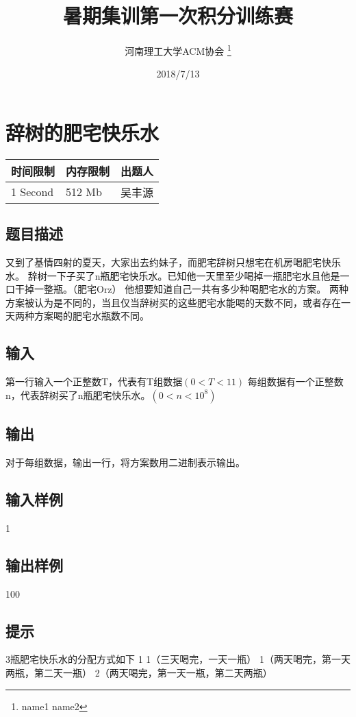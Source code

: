 \documentclass[12pt, a4paper]{article}
\title{暑期集训第一次积分训练赛}
\author{河南理工大学ACM协会 \thanks{name1 name2}}
\date{2018/7/13}
\begin{document}
\maketitle\newpage


\section{辞树的肥宅快乐水}

\begin{table}[!h]
  \centering
  \begin{tabular}{l|l|l}
  时间限制 & 内存限制 & 出题人 \\
  \hline
  1 Second & 512 Mb & 吴丰源 \\
\end{tabular}
\end{table}

\subsection*{题目描述}

又到了基情四射的夏天，大家出去约妹子，而肥宅辞树只想宅在机房喝肥宅快乐水。
辞树一下子买了n瓶肥宅快乐水。已知他一天里至少喝掉一瓶肥宅水且他是一口干掉一整瓶。（肥宅Orz）
他想要知道自己一共有多少种喝肥宅水的方案。
两种方案被认为是不同的，当且仅当辞树买的这些肥宅水能喝的天数不同，或者存在一天两种方案喝的肥宅水瓶数不同。

\subsection*{输入}

第一行输入一个正整数T，代表有T组数据$(0<T<11)$
每组数据有一个正整数n，代表辞树买了n瓶肥宅快乐水。$(0<n<10^8)$

\subsection*{输出}

对于每组数据，输出一行，将方案数用二进制表示输出。

\subsection*{输入样例}

1

\subsection*{输出样例}

100

 \subsection*{提示}
3瓶肥宅快乐水的分配方式如下 1 1（三天喝完，一天一瓶） 1（两天喝完，第一天两瓶，第二天一瓶） 2（两天喝完，第一天一瓶，第二天两瓶）
\end{document}

